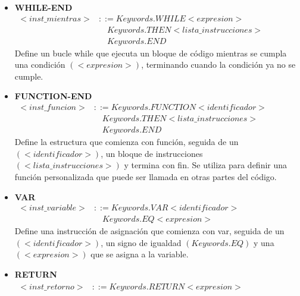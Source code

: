 \begin{itemize}
  \item \textbf{WHILE-END} \\
  \begin{math}
    \begin{array}{rl}
      <inst\_mientras> & ::= Keywords.WHILE <expresion> \\
        & \quad Keywords.THEN <lista\_instrucciones> \\
        & \quad Keywords.END
    \end{array}
  \end{math} \\
  Define un bucle while que ejecuta un bloque de código mientras se cumpla una condición $(<expresion>)$, terminando cuando la condición ya no se cumple.
  \item \textbf{FUNCTION-END} \\
  \begin{math}
    \begin{array}{rl}
      <inst\_funcion> & ::= Keywords.FUNCTION <identificador> \\
        & \quad Keywords.THEN <lista\_instrucciones> \\
        & \quad Keywords.END
    \end{array}
  \end{math} \\
  Define la estructura que comienza con función, seguida de un $(<identificador>)$, un bloque de instrucciones $(<lista\_instrucciones>)$ y termina con fin. Se utiliza para definir una función personalizada que puede ser llamada en otras partes del código.
  \item \textbf{VAR} \\
  \begin{math}
    \begin{array}{rl}
      <inst\_variable> & ::= Keywords.VAR <identificador> \\
      & \quad Keywords.EQ <expresion>
    \end{array}
  \end{math} \\
  Define una instrucción de asignación que comienza con var, seguida de un $(<identificador>)$, un signo de igualdad $(Keywords.EQ)$ y una $(<expresion>)$ que se asigna a la variable.
  \item \textbf{RETURN} \\
  \begin{math}
    \begin{array}{rl}
      <inst\_retorno> & ::= Keywords.RETURN <expresion>

\end{array}
\end{math}
\end{itemize}

